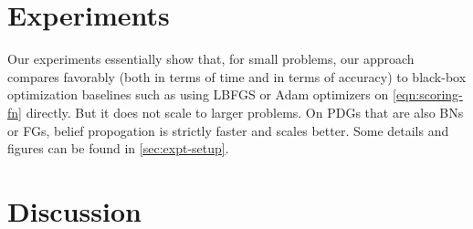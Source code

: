 %
%
\section{Experiments} \label{sec:expts}
Our experiments essentially show that, for small problems,
 our approach compares favorably (both in terms of time and in terms
 of accuracy) to black-box optimization baselines such as using LBFGS
 or Adam optimizers on \cref{eqn:scoring-fn} directly. 
  But it does not scale to larger problems. 
On PDGs that are also BNs or FGs, belief propogation is strictly faster and scales better.  
Some details and figures can be found in \cref{sec:expt-setup}.

\TODO



\section{Discussion}


